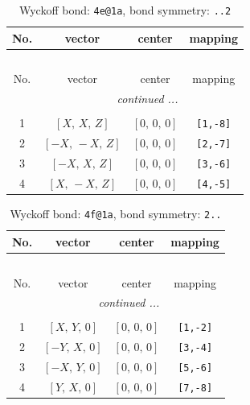\documentclass[fleqn,8pt]{jsarticle}
\begin{document}
\renewcommand{\arraystretch}{1.2}
\begin{longtable}{cccc}
\caption{Wyckoff bond: {\tt 4e@1a}, bond symmetry: {\tt ..2}}
 \\
 \hline \hline
No. & vector & center & mapping \\ \hline \endfirsthead

\multicolumn{3}{l}{\tablename\ \thetable{}} \\
 \hline \hline
No. & vector & center & mapping \\ \hline \endhead

 \hline \hline
\multicolumn{3}{r}{\footnotesize\it continued ...} \\ \endfoot

 \hline \hline
\multicolumn{3}{r}{} \\ \endlastfoot

1 & $\left[ X,\, X,\, Z \right]$ & $\left[ 0,\, 0,\, 0 \right]$ & {\tt [1,-8]} \\ \hline
2 & $\left[ - X,\, - X,\, Z \right]$ & $\left[ 0,\, 0,\, 0 \right]$ & {\tt [2,-7]} \\ \hline
3 & $\left[ - X,\, X,\, Z \right]$ & $\left[ 0,\, 0,\, 0 \right]$ & {\tt [3,-6]} \\ \hline
4 & $\left[ X,\, - X,\, Z \right]$ & $\left[ 0,\, 0,\, 0 \right]$ & {\tt [4,-5]} \\
\end{longtable}
\renewcommand{\arraystretch}{1.2}
\begin{longtable}{cccc}
\caption{Wyckoff bond: {\tt 4f@1a}, bond symmetry: {\tt 2..}}
 \\
 \hline \hline
No. & vector & center & mapping \\ \hline \endfirsthead

\multicolumn{3}{l}{\tablename\ \thetable{}} \\
 \hline \hline
No. & vector & center & mapping \\ \hline \endhead

 \hline \hline
\multicolumn{3}{r}{\footnotesize\it continued ...} \\ \endfoot

 \hline \hline
\multicolumn{3}{r}{} \\ \endlastfoot

1 & $\left[ X,\, Y,\, 0 \right]$ & $\left[ 0,\, 0,\, 0 \right]$ & {\tt [1,-2]} \\ \hline
2 & $\left[ - Y,\, X,\, 0 \right]$ & $\left[ 0,\, 0,\, 0 \right]$ & {\tt [3,-4]} \\ \hline
3 & $\left[ - X,\, Y,\, 0 \right]$ & $\left[ 0,\, 0,\, 0 \right]$ & {\tt [5,-6]} \\ \hline
4 & $\left[ Y,\, X,\, 0 \right]$ & $\left[ 0,\, 0,\, 0 \right]$ & {\tt [7,-8]} \\
\end{longtable}
\end{document}
